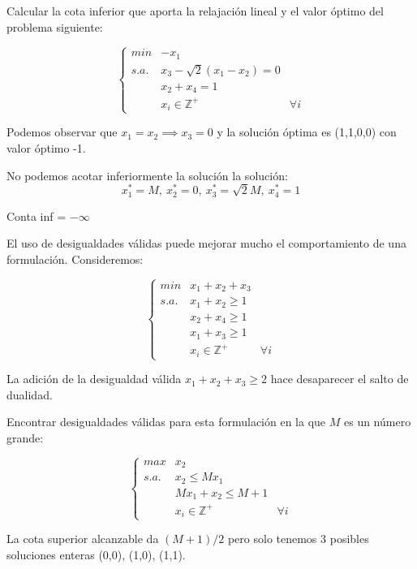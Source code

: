 \documentclass[openany]{book}
\begin{document}
\begin{example}
  Calcular la cota inferior que aporta la relajación lineal y el valor óptimo del problema siguiente:

  $$ 
  \left\{
  \begin{array}{llr}
    min &  -x_1\\
    s.a. & x_3-\sqrt{2}(x_1-x_2) = 0 \\
    & x_2+x_4 = 1 \\
    & x_i \in \mathbb{Z}^{+} & \forall i
  \end{array}
  \right.
  $$

  Podemos observar que $ x_1 = x_2 \implies x_3 = 0 $ y la solución óptima es (1,1,0,0) con valor óptimo -1.

  No podemos acotar inferiormente la solución la solución:
  $$ x_{1}^* = M,\ x_2^* = 0,\ x_3^* = \sqrt{2}M,\ x_4^* = 1 $$
  
  Conta inf = $ -\infty $


\end{example}

\begin{example}
  El uso de desigualdades válidas puede mejorar mucho el comportamiento de una formulación. Consideremos: 

  $$ 
  \left\{
  \begin{array}{llr}
    min & x_1+x_2+x_3\\
    s.a. & x_1+x_2 \geq 1\\
    & x_2+x_4 \geq 1 \\
    & x_1+x_3 \geq 1 \\
    & x_i \in \mathbb{Z}^{+} & \forall i
  \end{array}
  \right. 
  $$

  La adición de la desigualdad válida $ x_1+x_2+x_3\geq 2 $ hace desaparecer el salto de dualidad.
\end{example}


\begin{example}
  Encontrar desigualdades válidas para esta formulación en la que $ M $ es un número grande:

  $$ 
  \left\{
  \begin{array}{llr}
    max & x_2 \\
    s.a. & x_2 \leq Mx_1 \\
    & Mx_1+x_2 \leq M+1 \\
    & x_i \in \mathbb{Z} ^{+} & \forall i
  \end{array}
  \right.
  $$

  La cota superior alcanzable da $ (M+1)/2 $ pero solo tenemos 3 posibles soluciones enteras (0,0), (1,0), (1,1). 

\end{example}
\end{document}
